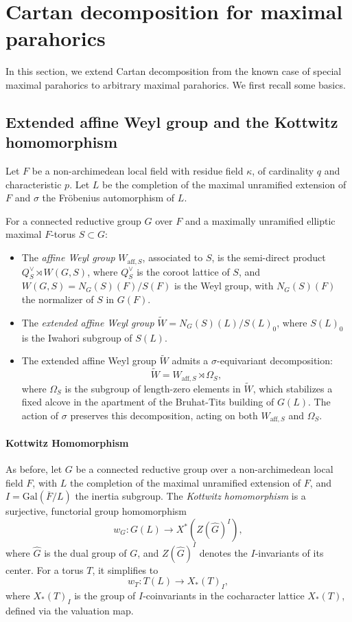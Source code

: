 \documentclass[american]{article}
\numberwithin{equation}{section}
\numberwithin{figure}{section}
\theoremstyle{plain}
\theoremstyle{definition}
\theoremstyle{remark}
\begin{document}
\appendix

\section{Cartan decomposition for maximal parahorics}
\label{app:Cartan}

In this section, we extend Cartan decomposition from the known case of special maximal parahorics to arbitrary maximal parahorics. We first recall some basics. 
\subsection{Extended affine Weyl group and the Kottwitz homomorphism}


Let $F$ be a non-archimedean local field with residue field $\kappa$, of cardinality \(q\) and characteristic \(p\). Let $L$ be the completion of the maximal unramified extension of $F$ and $\sigma$  the Fr\"obenius automorphism of $L$.

For a connected reductive group $G$ over $F$ and a maximally unramified elliptic maximal $F$-torus $S \subset G$:
\begin{itemize}
    \item The \textit{affine Weyl group} $W_{\text{aff}, S}$, associated to $S$, is the semi-direct product $Q_S^{\vee} \rtimes W(G, S)$, where $Q_S^{\vee}$ is the coroot lattice of $S$, and $W(G, S) = N_G(S)(F) / S(F)$ is the Weyl group, with $N_G(S)(F)$ the normalizer of $S$ in $G(F)$.
    \item The \textit{extended affine Weyl group} $\widetilde{W} = N_G(S)(L) / S(L)_0$, where $S(L)_0$ is the Iwahori subgroup of $S(L)$. 
    \item The extended affine Weyl group $\widetilde{W}$ admits a $\sigma$-equivariant decomposition:
    \[
    \widetilde{W} = W_{\text{aff}, S} \rtimes \Omega_S,
    \]
    where $\Omega_S$ is the subgroup of length-zero elements in $\widetilde{W}$, which stabilizes a fixed alcove in the apartment of the Bruhat-Tits building of $G(L)$. The action of $\sigma$ preserves this decomposition, acting on both $W_{\text{aff}, S}$ and $\Omega_S$.
\end{itemize}

\paragraph{Kottwitz Homomorphism}

As before, let $G$ be a connected reductive group over a non-archimedean local field $F$, with $L$ the completion of the maximal unramified extension of $F$, and $I = \mathrm{Gal}(\overline{F}/L)$ the inertia subgroup. The \emph{Kottwitz homomorphism} \cite[\S 7]{Kot97} is a surjective, functorial group homomorphism
\[
w_G: G(L) \to X^*(Z(\widehat{G})^I),
\]
where $\widehat{G}$ is the dual group of $G$, and $Z(\widehat{G})^I$ denotes the $I$-invariants of its center. For a torus $T$, it simplifies to
\[
w_T: T(L) \to X_*(T)_I,
\]
where $X_*(T)_I$ is the group of $I$-coinvariants in the cocharacter lattice $X_*(T)$, defined via the valuation map.
\end{document}
